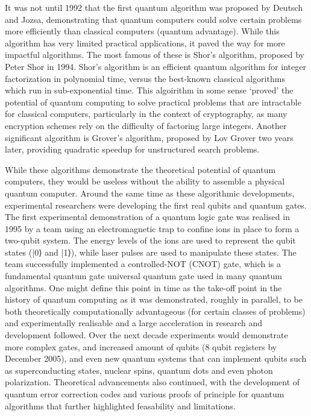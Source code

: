 \documentclass{elbioimp2}
\begin{document}
It was not until 1992 that the first quantum algorithm was proposed by Deutsch and Jozsa\cite{Deutsch1992},
demonstrating that quantum computers could solve certain problems more efficiently than classical computers 
(quantum advantage). While this algorithm has very limited practical applications, it paved the way for more 
impactful algorithms.
The most famous of these is Shor's algorithm, proposed by Peter Shor in 1994\cite{Shor1994}. Shor's algorithm 
is an efficient quantum algorithm for integer factorization in polynomial time, versus the best-known classical
algorithms which run in sub-exponential time. This algoirithm in some sense `proved' the potential of quantum computing
to solve practical problems that are intractable for classical computers, particularly in the context of cryptography, as
many encryption schemes rely on the difficulty of factoring large integers. 
Another significant algorithm is Grover's algorithm, proposed by Lov Grover two years later\cite{Grover1996}, providing
quadratic speedup for unstructured search problems.

While these algorithms demonstrate the theoretical potential of quantum computers, they would be useless without
the ability to assemble a physical quantum computer. Around the same time as these algorithmic developments,
experimental researchers were developing the first real qubits and quantum gates. The first experimental demonstration
of a quantum logic gate was realised in 1995 by a team using an electromagnetic trap to confine ions in place to form a two-qubit
system. The energy levels of the ions are used to represent the qubit states (|0⟩ and |1⟩), while laser pulses are used 
to manipulate these states. The team successfully implemented a controlled-NOT (CNOT) gate, which is a fundamental quantum gate
universal quantum gate used in many quantum algorithms\cite{Monroe1995}. 
One might define this point in time as the take-off point in the history of quantum computing as it was demonstrated, roughly in parallel,
to be both theoretically computationally advantageous (for certain classes of problems) and experimentally realisable and a large acceleration
in research and development followed. Over the next decade experiments would demonstrate  more complex gates, and increased amount of qubits 
(8 qubit registers by December 2005)\cite{https://www.nature.com/articles/nature04279}, and even new quantum systems that can implement qubits 
such as superconducting states, nuclear spins, quantum dots and even photon polarization\cite{Monroe1995}. Theoretical advancements also continued, with the 
development of quantum error correction codes and various proofs of principle for quantum algorithms that further highlighted feasability and
limitations.
\end{document}
